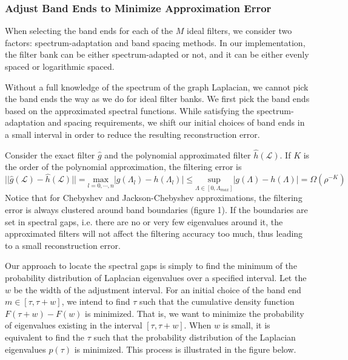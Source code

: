 \documentclass[a4paper]{article}
\renewcommand{\L}{\boldsymbol{\mathcal{L}}}
\theoremstyle{definition}
\begin{document}
\subsubsection{Adjust Band Ends to Minimize Approximation Error}
When selecting the band ends for each of the $M$ ideal filters, we consider two factors: spectrum-adaptation and band spacing methods. In our implementation, the filter bank can be either spectrum-adapted or not, and it can be either evenly spaced or logarithmic spaced.

Without a full knowledge of the spectrum of the graph Laplacian, we cannot pick the band ends the way as we do for ideal filter banks. We first pick the band ends based on the approximated spectral functions. While satisfying the spectrum-adaptation and spacing requirements, we shift our initial choices of band ends in a small interval in order to reduce the resulting reconstruction error.

Consider the exact filter $\hat{g}$ and the polynomial approximated filter $\hat{h}(\L)$. If $K$ is the order of the polynomial approximation, the filtering error is 
$$||\hat{g}(\L) - \hat{h}(\L)|| = \underset{l = 0,\cdots,n}{\text{max}} |g(\Lambda_l) - h(\Lambda_l)| \leq \underset{\Lambda \in [0, \Lambda_{max}]}{ \text{sup}} |g(\Lambda) - h(\Lambda)| = \Omega(\rho^{-K})$$
Notice that for Chebyshev and Jackson-Chebyshev approximations, the filtering error is always clustered around band boundaries (figure 1). If the boundaries are set in spectral gaps, i.e. there are no or very few eigenvalues around it, the approximated filters will not affect the filtering accuracy too much, thus leading to a small reconstruction error.  

Our approach to locate the spectral gaps is simply to find the minimum of the probability distribution of Laplacian eigenvalues over a specified interval. Let the $w$ be the width of the adjustment interval. For an initial choice of the band end $m \in [\tau, \tau+w]$, we intend to find $\tau$ such that the cumulative density function $F(\tau+w)-F(w)$ is minimized. That is, we want to minimize the probability of eigenvalues existing in the interval $[\tau, \tau+w]$. When $w$ is small, it is equivalent to find the $\tau$ such that the probability distribution of the Laplacian eigenvalues $p(\tau)$ is minimized. This process is illustrated in the figure below.
\end{document}
